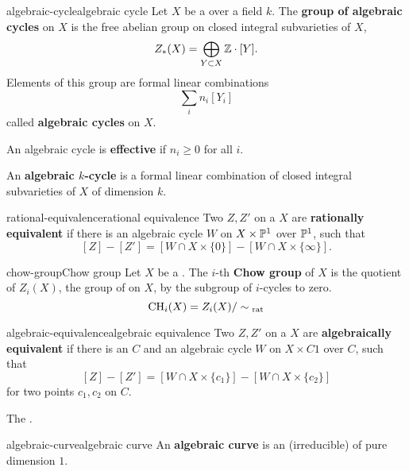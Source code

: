 \begin{topic}{algebraic-cycle}{algebraic cycle}
    Let $X$ be a  over a field $k$. The \textbf{group of algebraic cycles} on $X$ is the free abelian group on closed integral subvarieties of $X$,
    \[ Z_*(X) = \bigoplus_{Y \subset X} \mathbb{Z} \cdot [Y] . \] 
    Elements of this group are formal linear combinations
    \[ \sum_i n_i [Y_i] \]
    called \textbf{algebraic cycles} on $X$.
    
    An algebraic cycle is \textbf{effective} if $n_i \ge 0$ for all $i$.
    
    An \textbf{algebraic $k$-cycle} is a formal linear combination of closed integral subvarieties of $X$ of dimension $k$.
\end{topic}

\begin{topic}{rational-equivalence}{rational equivalence}
    Two  $Z, Z'$ on a  $X$ are \textbf{rationally equivalent} if there is an algebraic cycle $W$ on $X \times \mathbb{P}^1$  over $\mathbb{P}^1$, such that
    \[ [Z] - [Z'] = [W \cap X \times \{ 0 \}] - [W \cap X \times \{ \infty \}] . \]
\end{topic}

\begin{topic}{chow-group}{Chow group}
    Let $X$ be a . The $i$-th \textbf{Chow group} of $X$ is the quotient of $Z_i(X)$, the group of  on $X$, by the subgroup of $i$-cycles  to zero.
    \[ \text{CH}_i(X) = Z_i(X) / \sim{}_\textup{rat} \]
\end{topic}

\begin{topic}{algebraic-equivalence}{algebraic equivalence}
    Two  $Z, Z'$ on a  $X$ are \textbf{algebraically equivalent} if there is an  $C$ and an algebraic cycle $W$ on $X \times C1$  over $C$, such that
    \[ [Z] - [Z'] = [W \cap X \times \{ c_1 \}] - [W \cap X \times \{ c_2 \}] \]
    for two points $c_1, c_2$ on $C$.
    
    The .
\end{topic}

\begin{topic}{algebraic-curve}{algebraic curve}
    An \textbf{algebraic curve} is an (irreducible)  of pure dimension $1$.
\end{topic}

